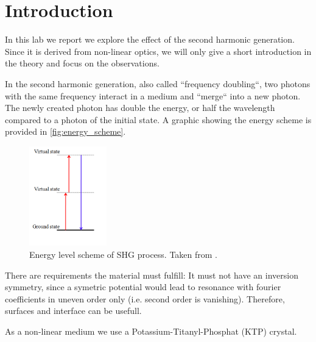 \section{Introduction}
\label{sec:introduction}
In this lab we report we explore the effect of the second harmonic generation. Since it is derived
from non-linear optics, we will only give a short introduction in the theory and focus on the
observations.

In the second harmonic generation, also called ``frequency doubling``, two photons with the same
frequency interact in a
medium and ``merge`` into a new photon. The newly created photon has double the energy, or half the wavelength
compared to a photon of the initial state. A graphic showing the energy scheme is provided in
\autoref{fig:energy_scheme}.
\begin{figure}
    \centering
    \includegraphics[width=0.3\textwidth]{media/Energy_level_scheme_of_SHG.png}
    \caption{Energy level scheme of SHG process. Taken from \cite{energy_level_scheme}.}
    \label{fig:energy_scheme}
\end{figure}
There are requirements the material must fulfill: It must not have an inversion symmetry, since a
symetric potential would lead to resonance with fourier coefficients in uneven order only (i.e.
second order is vanishing). Therefore, surfaces and interface can be usefull.

As a non-linear medium we use a Potassium-Titanyl-Phosphat (KTP) crystal. 

